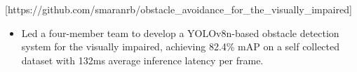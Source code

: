 
[https://github.com/smaranrb/obstacle_avoidance_for_the_visually_impaired]
\begin{itemize}
  \item Led a four-member team to develop a YOLOv8n-based obstacle detection system for the visually impaired, achieving 82.4\% mAP on a self collected dataset with 132ms average inference latency per frame.
\end{itemize}



